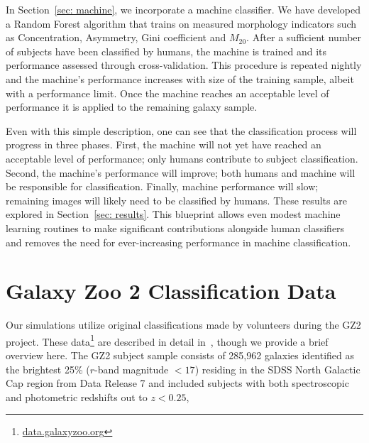 \documentclass[twocolumn]{aastex6}
\newcommand{\M}[1]{$M_{\mathrm{#1}}$}
\begin{document}
In Section~\ref{sec: machine}, we incorporate a machine classifier. We have 
developed a Random Forest algorithm that trains on measured morphology
indicators such as Concentration, Asymmetry, Gini coefficient and \M{20}. 
After a sufficient number of subjects have been classified by humans, 
 the machine is trained and its performance assessed through cross-validation. 
This procedure is repeated nightly and the machine's performance increases with
size of the training sample, albeit with a performance limit. 
Once the machine reaches an acceptable level of 
performance it is applied to the remaining galaxy sample. 


Even with this simple description, one can see that the classification process 
will progress in three phases.  First, the machine will not yet have reached an 
acceptable level of performance; only humans contribute to subject classification.
Second, the machine's performance will improve; both humans and machine 
will be responsible for classification. Finally, machine performance 
will slow; remaining images will likely need to be classified by humans. 
These results are explored in  Section~\ref{sec: results}. 
This blueprint allows even modest machine learning 
routines to make significant contributions alongside human classifiers and 
removes the need for ever-increasing performance in machine classification.



\section{Galaxy Zoo 2 Classification Data} \label{sec: data}

Our simulations utilize original classifications made by volunteers during the GZ2 project. 
These data\footnote{\url{data.galaxyzoo.org}} are described in detail in~\cite{Willett2013}, 
though we provide a brief overview here.  
The GZ2 subject sample consists of 285,962 galaxies identified as the
 brightest 25\% ($r$-band magnitude $< 17$) residing in the SDSS North Galactic 
Cap region from Data Release 7 and included subjects with both spectroscopic and 
photometric redshifts out to $z < 0.25$,
\end{document}
